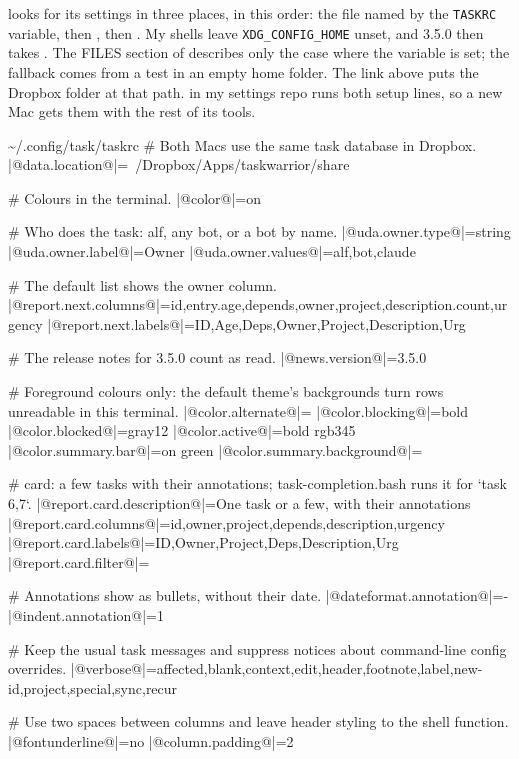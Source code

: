 \documentclass[11pt,a4paper]{article}
\newcommand{\home}{\textasciitilde}  %
\begin{document}
 looks for its settings in three places, in this order: the file named by the \texttt{TASKRC} variable, then \name{\home/.taskrc}, then . My shells leave \texttt{XDG\_CONFIG\_HOME} unset, and 3.5.0 then takes \name{\home/.config/task/taskrc}. The FILES section of  describes only the case where the variable is set; the fallback comes from a test in an empty home folder. The link above puts the Dropbox folder at that path.  in my settings repo runs both setup lines, so a new Mac gets them with the rest of its tools.

\begin{config}{\home/.config/task/taskrc}
# Both Macs use the same task database in Dropbox.
|@data.location@|=~/Dropbox/Apps/taskwarrior/share

# Colours in the terminal.
|@color@|=on

# Who does the task: alf, any bot, or a bot by name.
|@uda.owner.type@|=string
|@uda.owner.label@|=Owner
|@uda.owner.values@|=alf,bot,claude

# The default list shows the owner column.
|@report.next.columns@|=id,entry.age,depends,owner,project,description.count,urgency
|@report.next.labels@|=ID,Age,Deps,Owner,Project,Description,Urg

# The release notes for 3.5.0 count as read.
|@news.version@|=3.5.0

# Foreground colours only: the default theme's backgrounds turn rows unreadable in this terminal.
|@color.alternate@|=
|@color.blocking@|=bold
|@color.blocked@|=gray12
|@color.active@|=bold rgb345
|@color.summary.bar@|=on green
|@color.summary.background@|=

# card: a few tasks with their annotations; task-completion.bash runs it for `task 6,7`.
|@report.card.description@|=One task or a few, with their annotations
|@report.card.columns@|=id,owner,project,depends,description,urgency
|@report.card.labels@|=ID,Owner,Project,Deps,Description,Urg
|@report.card.filter@|=

# Annotations show as bullets, without their date.
|@dateformat.annotation@|=-
|@indent.annotation@|=1

# Keep the usual task messages and suppress notices about command-line config overrides.
|@verbose@|=affected,blank,context,edit,header,footnote,label,new-id,project,special,sync,recur

# Use two spaces between columns and leave header styling to the shell function.
|@fontunderline@|=no
|@column.padding@|=2
\end{config}
\end{document}
